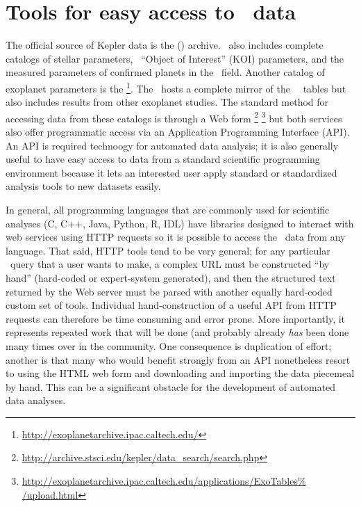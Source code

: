 \documentclass[letterpaper,12pt,preprint]{hack_aastex}
\begin{document}
\section{Tools for easy access to \Kepler\ data}

The official source of Kepler data is the
 (\MAST) archive.
\MAST\ also includes complete catalogs of stellar parameters, \Kepler\ ``Object of
Interest'' (KOI) parameters, and the measured parameters of confirmed planets
in the \Kepler\ field.
Another catalog of exoplanet parameters is the %
\footnote{\url{http://exoplanetarchive.ipac.caltech.edu/}}.
The \EA\ hosts a complete mirror of the \MAST\ \Kepler\ tables but
also includes results from other exoplanet studies.
The standard method for accessing data from these catalogs is through a Web
form%
\footnote{\url{http://archive.stsci.edu/kepler/data\_search/search.php}}%
\footnote{\url{http://exoplanetarchive.ipac.caltech.edu/applications/ExoTables%
/upload.html}}
but both services also offer programmatic access via an Application
Programming Interface (API).
An API is required technoogy for automated data analysis;
it is also generally useful to have easy access to data from a standard
scientific programming environment because it lets an interested user apply
standard or standardized analysis tools to new datasets easily.

In general, all programming languages that are commonly used for scientific analyses (C, C++, Java, Python, R, IDL) have
libraries designed to interact with web services using HTTP requests so it is
possible to access the \Kepler\ data from any language.
That said, HTTP tools tend to be very general;
for any particular \Kepler\ query that a user wants to make,
a complex URL must be constructed ``by hand'' (hard-coded or expert-system generated),
and then the structured text returned by the Web server must be parsed with another equally hard-coded custom set of tools.
Individual hand-construction of a useful API from HTTP requests can therefore be time consuming and error prone.
More importantly, it represents repeated work that will be done (and probably already \emph{has} been done many times over in the community.
One consequence is duplication of effort; another is that many who would benefit strongly from an API nonetheless
resort to using the HTML web form and downloading and importing the data piecemeal by hand.
This can be a significant obstacle for the development of automated data analyses.
\end{document}
